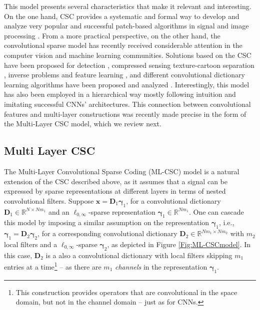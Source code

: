 \documentclass[10pt,journal]{IEEEtran}
\def\x{{\mathbf x}}
\def\D{{\mathbf D}}
\def\gama{{\boldsymbol \gamma}}
\def\Loi{{\ell_{0,\infty}}}
\theoremstyle{plain}
\theoremstyle{definition}
\begin{document}
This model presents several characteristics that make it relevant and interesting. On the one hand, CSC provides a systematic and formal way to develop and analyze very popular and successful patch-based algorithms in signal and image processing \cite{WorkingLocallyThinkingGlobally}. From a more practical perspective, on the other hand, the convolutional sparse model has recently received considerable attention in the computer vision and machine learning communities. Solutions based on the CSC have been proposed for detection \cite{sermanet2013pedestrian}, compressed sensing \cite{li2013convolutional} texture-cartoon separation \cite{zhang2016convolutional,zhang2018convolutional}, inverse problems \cite{Papyan_2017_ICCV,Heide2015,choudhury2017consensus} and feature learning \cite{henaff2011unsupervised,szlam2011structured}, and different convolutional dictionary learning algorithms have been proposed and analyzed \cite{Papyan_2017_ICCV,Wohlberg2016,liu2017online}. Interestingly, this model has also been employed in a hierarchical way \cite{zeiler2010deconvolutional,szlam2010convolutional,kavukcuoglu2010learning,he2014unsupervised} mostly following intuition and imitating successful CNNs' architectures. This connection between convolutional features and multi-layer constructions was recently made precise in the form of the Multi-Layer CSC model, which we review next.


\subsection{Multi Layer CSC}
\label{sec:MultiLayerCSC}
The Multi-Layer Convolutional Sparse Coding (ML-CSC) model is a natural extension of the CSC described above, as it assumes that a signal can be expressed by sparse representations at different layers in terms of nested convolutional filters. Suppose $\x = \D_1\gama_1$, for a convolutional dictionary $\D_1 \in \mathbb{R}^{N\times Nm_1}$ and an $\Loi$-sparse representation $\gama_1 \in \mathbb{R}^{Nm_1}$.  One can cascade this model by imposing a similar assumption on the representation $\gama_1$, i.e., $\gama_1 = \D_2\gama_2$, for a corresponding convolutional dictionary $\D_2\in\mathbb{R}^{Nm_1\times Nm_2}$ with $m_2$ local filters and a $\Loi$-sparse $\gama_2$, as depicted in Figure \ref{Fig:ML-CSCmodel}. In this case, $\D_2$ is a also a convolutional dictionary with local filters skipping $m_1$ entries at a time\footnote{This construction provides operators that are convolutional in the space domain, but not in the channel domain -- just as for CNNs.} -- as there are $m_1$ \emph{channels} in the representation $\gama_1$. 
\end{document}
